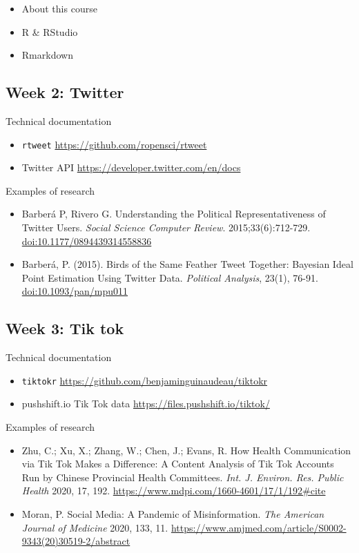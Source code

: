 \documentclass[11pt,]{article}
\providecommand{\tightlist}{%
  \setlength{\itemsep}{0pt}\setlength{\parskip}{0pt}}
\begin{document}
\begin{itemize}
\tightlist
\item
  About this course
\item
  R \& RStudio
\item
  Rmarkdown
\end{itemize}

\hypertarget{week-2-twitter}{%
\subsection{Week 2: Twitter}\label{week-2-twitter}}

Technical documentation

\begin{itemize}
\tightlist
\item
  \texttt{rtweet} \url{https://github.com/ropensci/rtweet}
\item
  Twitter API \url{https://developer.twitter.com/en/docs}
\end{itemize}

Examples of research

\begin{itemize}
\tightlist
\item
  Barberá P, Rivero G. Understanding the Political Representativeness of
  Twitter Users. \emph{Social Science Computer Review}.
  2015;33(6):712-729. \url{doi:10.1177/0894439314558836}
\item
  Barberá, P. (2015). Birds of the Same Feather Tweet Together: Bayesian
  Ideal Point Estimation Using Twitter Data. \emph{Political Analysis},
  23(1), 76-91. \url{doi:10.1093/pan/mpu011}
\end{itemize}

\hypertarget{week-3-tik-tok}{%
\subsection{Week 3: Tik tok}\label{week-3-tik-tok}}

Technical documentation

\begin{itemize}
\tightlist
\item
  \texttt{tiktokr} \url{https://github.com/benjaminguinaudeau/tiktokr}
\item
  pushshift.io Tik Tok data \url{https://files.pushshift.io/tiktok/}
\end{itemize}

Examples of research

\begin{itemize}
\tightlist
\item
  Zhu, C.; Xu, X.; Zhang, W.; Chen, J.; Evans, R. How Health
  Communication via Tik Tok Makes a Difference: A Content Analysis of
  Tik Tok Accounts Run by Chinese Provincial Health Committees.
  \emph{Int. J. Environ. Res. Public Health} 2020, 17, 192.
  \url{https://www.mdpi.com/1660-4601/17/1/192\#cite}
\item
  Moran, P. Social Media: A Pandemic of Misinformation. \emph{The
  American Journal of Medicine} 2020, 133, 11.
  \url{https://www.amjmed.com/article/S0002-9343(20)30519-2/abstract}
\end{itemize}
\end{document}
